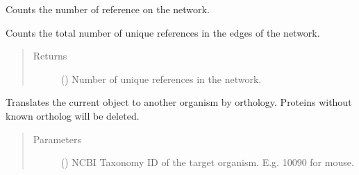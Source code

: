 \documentclass[letterpaper,10pt,english]{sphinxmanual}
\begin{document}
\begin{fulllineitems}
\begin{fulllineitems}
\label{\detokenize{main:pypath.main.PyPath.numof_references}}
Counts the number of reference on the network.

Counts the total number of unique references in the edges of the
network.
\begin{quote}\begin{description}
\item[{Returns}] \leavevmode
() \textendash{} Number of unique references in the network.

\end{description}\end{quote}

\end{fulllineitems}


\begin{fulllineitems}
\label{\detokenize{main:pypath.main.PyPath.numof_undirected_edges}}
\end{fulllineitems}


\begin{fulllineitems}
\label{\detokenize{main:pypath.main.PyPath.orthology_translation}}
Translates the current object to another organism by orthology.
Proteins without known ortholog will be deleted.
\begin{quote}\begin{description}
\item[{Parameters}] \leavevmode
{} () \textendash{} NCBI Taxonomy ID of the target organism.
E.g. 10090 for mouse.

\end{description}\end{quote}

\end{fulllineitems}



\end{fulllineitems}
\end{document}
